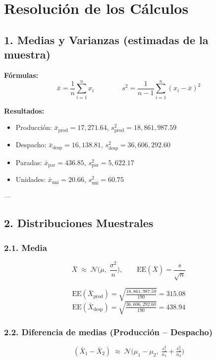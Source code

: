 \section*{Resolución de los Cálculos}

\subsection*{1. Medias y Varianzas (estimadas de la muestra)}

\textbf{Fórmulas:}
\[
\bar x = \frac{1}{n}\sum_{i=1}^n x_i
\qquad\qquad
s^2 = \frac{1}{n-1}\sum_{i=1}^n (x_i-\bar x)^2
\]

\textbf{Resultados:}
\begin{itemize}
    \item Producción: $\bar x_{\text{prod}} = 17{,}271.64$, \quad $s^2_{\text{prod}} = 18{,}861{,}987.59$
    \item Despacho: $\bar x_{\text{desp}} = 16{,}138.81$, \quad $s^2_{\text{desp}} = 36{,}606{,}292.60$
    \item Paradas: $\bar x_{\text{par}} = 436.85$, \quad $s^2_{\text{par}} = 5{,}622.17$
    \item Unidades: $\bar x_{\text{uni}} = 20.66$, \quad $s^2_{\text{uni}} = 60.75$
\end{itemize}

---

\subsection*{2. Distribuciones Muestrales}

\subsubsection*{2.1. Media}
\[
\bar X \;\approx\; \mathcal N\!\Big(\mu,\;\frac{\sigma^2}{n}\Big), 
\qquad
\text{EE}(\bar X)=\frac{s}{\sqrt{n}}
\]

\[
\text{EE}(\bar X_{\text{prod}})=\sqrt{\tfrac{18{,}861{,}987.59}{190}}=315.08
\]
\[
\text{EE}(\bar X_{\text{desp}})=\sqrt{\tfrac{36{,}606{,}292.60}{190}}=438.94
\]

\subsubsection*{2.2. Diferencia de medias (Producción – Despacho)}
\[
(\bar X_1-\bar X_2)\;\approx\;\mathcal N\!\Big(\mu_1-\mu_2,\;\tfrac{s_1^2}{n_1}+\tfrac{s_2^2}{n_2}\Big)
\]


